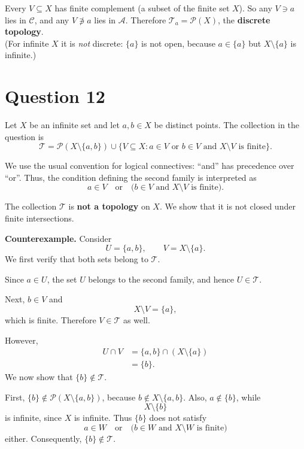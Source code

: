 \documentclass[11pt]{article}
\newcommand{\Pow}{\mathcal{P}}
\newcommand{\T}{\mathcal{T}}
\begin{document}
\begin{ans}
Every $V\subseteq X$ has finite complement (a subset of the finite set $X$). So any $V\ni a$ lies in $\mathcal C$, and any $V\not\ni a$ lies in $\mathcal A$. Therefore $\T_a=\Pow(X)$, the \textbf{discrete topology}.\\
(For infinite $X$ it is \emph{not} discrete: $\{a\}$ is not open, because $a\in\{a\}$ but $X\setminus\{a\}$ is infinite.)
\end{ans}

\section*{Question 12}

Let $X$ be an infinite set and let $a,b\in X$ be distinct points.
The collection in the question is
\[
\T=\Pow(X\setminus\{a,b\})\cup
\{V\subseteq X: a\in V\text{ or }b\in V
\text{ and }X\setminus V\text{ is finite}\}.
\]

We use the usual convention for logical connectives: ``and'' has
precedence over ``or''. Thus, the condition defining the second
family is interpreted as
\[
 a\in V\quad\text{or}\quad
 \bigl(b\in V\text{ and }X\setminus V\text{ is finite}\bigr).
\]

\begin{ans}[Answer]
The collection $\T$ is \textbf{not a topology} on $X$.
We show that it is not closed under finite intersections.
\end{ans}

\textbf{Counterexample.} Consider
\[
 U=\{a,b\},\qquad V=X\setminus\{a\}.
\]
We first verify that both sets belong to $\T$.

Since $a\in U$, the set $U$ belongs to the second family,
and hence $U\in\T$.

Next, $b\in V$ and
\[
 X\setminus V=\{a\},
\]
which is finite. Therefore $V\in\T$ as well.

However,
\[
\begin{aligned}
 U\cap V
 &=\{a,b\}\cap(X\setminus\{a\})\\
 &=\{b\}.
\end{aligned}
\]
We now show that $\{b\}\notin\T$.

First, $\{b\}\notin\Pow(X\setminus\{a,b\})$, because
$b\notin X\setminus\{a,b\}$. Also, $a\notin\{b\}$, while
\[
 X\setminus\{b\}
\]
is infinite, since $X$ is infinite. Thus $\{b\}$ does not satisfy
\[
 a\in W\quad\text{or}\quad
 \bigl(b\in W\text{ and }X\setminus W\text{ is finite}\bigr)
\]
either. Consequently, $\{b\}\notin\T$.
\end{document}
